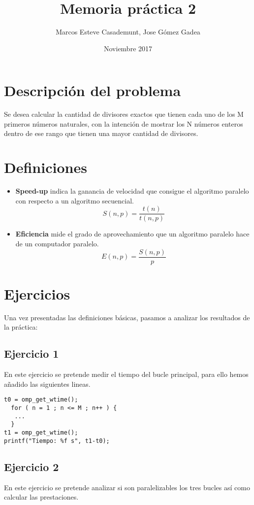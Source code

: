 \documentclass[11pt,oneside,a4paper]{article}
\title{Memoria práctica 2}
\author{Marcos Esteve Casademunt, Jose Gómez Gadea}
\date{Noviembre 2017}
\begin{document}
\maketitle
\tableofcontents
\newpage
\section{Descripción del problema}
Se desea calcular la cantidad de divisores exactos que tienen cada uno de los M primeros números naturales, con la intención de mostrar los N números enteros dentro de ese rango que tienen una mayor cantidad de divisores.
\section{Definiciones}
\begin{itemize}

\item \textbf{Speed-up} indica la ganancia de velocidad que consigue el
algoritmo paralelo con respecto a un algoritmo secuencial.
\begin{equation}
S(n,p) =  \frac{t(n)}{ t(n,p)}
\end{equation}
\item \textbf{Eficiencia} mide el grado de aprovechamiento que un algoritmo paralelo hace de un computador paralelo.
\begin{equation}
E(n,p) = \frac{S(n,p)}{p}
\end{equation}

\end{itemize}
\section{Ejercicios}
Una vez presentadas las definiciones básicas, pasamos a analizar los resultados de la práctica:
\subsection{Ejercicio 1}
En este ejercicio se pretende medir el tiempo del bucle principal, para ello hemos añadido las siguientes lineas.
\lstset{language=C, breaklines=true, basicstyle=\footnotesize}
\begin{lstlisting}[frame=single,  showstringspaces=false]
t0 = omp_get_wtime();
  for ( n = 1 ; n <= M ; n++ ) {
   ...
  }
t1 = omp_get_wtime();
printf("Tiempo: %f s", t1-t0);
\end{lstlisting}
\subsection{Ejercicio 2}
En este ejercicio se pretende analizar si son paralelizables los tres bucles así como calcular las prestaciones.
\end{document}
